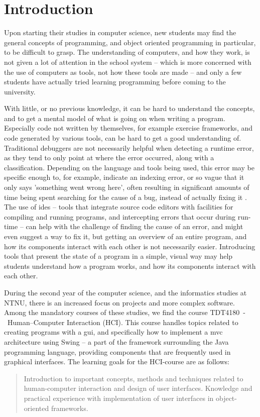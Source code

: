 \chapter{Introduction}\label{introduction}

Upon starting their studies in computer science, new students may find the general concepts of programming, and object oriented programming in particular, to be difficult to grasp.
The understanding of computers, and how they work, is not given a lot of attention in the school system -- which is more concerned with the use of computers as tools, not how these tools are made -- and only a few students have actually tried learning programming before coming to the university. %

With little, or no previous knowledge, it can be hard to understand the concepts, and to get a mental model of what is going on when writing a program.
Especially code not written by themselves, for example exercise frameworks, and code generated by various tools, can be hard to get a good understanding of.
Traditional debuggers are not necessarily helpful when detecting a runtime error, as they tend to only point at where the error occurred, along with a classification.
Depending on the language and tools being used, this error may be specific enough to, for example, indicate an indexing error, or so vague that it only says 'something went wrong here', often resulting in significant amounts of time being spent searching for the cause of a bug, instead of actually fixing it \cite{ko2006}. %
The use of \glspl{ide} -- tools that integrate source code editors with facilities for compiling and running programs, and intercepting errors that occur during run-time -- can help with the challenge of finding the cause of an error, and might even suggest a way to fix it, but getting an overview of an entire program, and how its components interact with each other is not necessarily easier.
Introducing tools that present the state of a program in a simple, visual way may help students understand how a program works, and how its components interact with each other.

During the second year of the computer science, and the informatics studies at NTNU, there is an increased focus on projects and more complex software.
Among the mandatory courses of these studies, we find the course TDT4180~-~Human--Computer Interaction (HCI).
This course handles topics related to creating programs with a \gls{gui}, and specifically how to implement a \gls{mvc} architecture using Swing -- a part of the framework surrounding the Java programming language, providing components that are frequently used in graphical interfaces.
The learning goals for the HCI-course are as follows:
\begin{quote}
Introduction to important concepts, methods and techniques related to human-computer interaction and design of user interfaces.
Knowledge and practical experience with implementation of user interfaces in object-oriented frameworks.
\end{quote}

